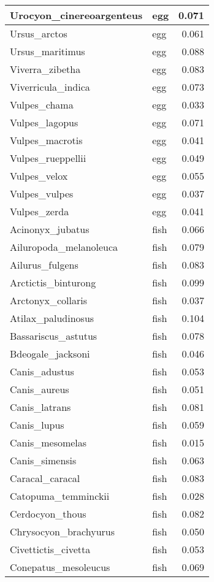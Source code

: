 \begin{table}
\begin{tabular}[t]{l|l|r}
\hline
Urocyon\_cinereoargenteus & egg & 0.071\\
\hline
Ursus\_arctos & egg & 0.061\\
\hline
Ursus\_maritimus & egg & 0.088\\
\hline
Viverra\_zibetha & egg & 0.083\\
\hline
Viverricula\_indica & egg & 0.073\\
\hline
Vulpes\_chama & egg & 0.033\\
\hline
Vulpes\_lagopus & egg & 0.071\\
\hline
Vulpes\_macrotis & egg & 0.041\\
\hline
Vulpes\_rueppellii & egg & 0.049\\
\hline
Vulpes\_velox & egg & 0.055\\
\hline
Vulpes\_vulpes & egg & 0.037\\
\hline
Vulpes\_zerda & egg & 0.041\\
\hline
Acinonyx\_jubatus & fish & 0.066\\
\hline
Ailuropoda\_melanoleuca & fish & 0.079\\
\hline
Ailurus\_fulgens & fish & 0.083\\
\hline
Arctictis\_binturong & fish & 0.099\\
\hline
Arctonyx\_collaris & fish & 0.037\\
\hline
Atilax\_paludinosus & fish & 0.104\\
\hline
Bassariscus\_astutus & fish & 0.078\\
\hline
Bdeogale\_jacksoni & fish & 0.046\\
\hline
Canis\_adustus & fish & 0.053\\
\hline
Canis\_aureus & fish & 0.051\\
\hline
Canis\_latrans & fish & 0.081\\
\hline
Canis\_lupus & fish & 0.059\\
\hline
Canis\_mesomelas & fish & 0.015\\
\hline
Canis\_simensis & fish & 0.063\\
\hline
Caracal\_caracal & fish & 0.083\\
\hline
Catopuma\_temminckii & fish & 0.028\\
\hline
Cerdocyon\_thous & fish & 0.082\\
\hline
Chrysocyon\_brachyurus & fish & 0.050\\
\hline
Civettictis\_civetta & fish & 0.053\\
\hline
Conepatus\_mesoleucus & fish & 0.069\\

\end{tabular}
\end{table}
